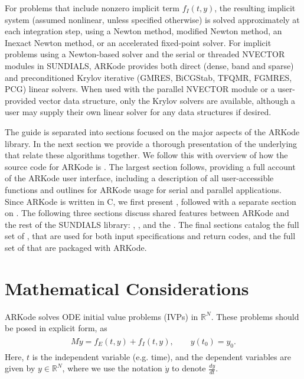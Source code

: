 \documentclass[letterpaper,10pt,english]{sphinxmanual}
\begin{document}
For problems that include nonzero implicit term \(f_I(t,y)\), the
resulting implicit system (assumed nonlinear, unless specified
otherwise) is solved approximately at each integration step, using a
Newton method, modified Newton method, an Inexact Newton method, or an
accelerated fixed-point solver.  For implicit problems using a
Newton-based solver and the serial or threaded NVECTOR modules in
SUNDIALS, ARKode provides both direct (dense, band and sparse) and
preconditioned Krylov iterative (GMRES, BiCGStab, TFQMR, FGMRES, PCG)
linear solvers. When used with the parallel NVECTOR module or a
user-provided vector data structure, only the Krylov solvers are
available, although a user may supply their own linear solver for any
data structures if desired.

The guide is separated into sections focused on the major aspects of
the ARKode library.  In the next section we provide a thorough
presentation of the underlying {\hyperref[Mathematics:mathematics]{\emph{}}} that
relate these algorithms together.  We follow this with overview of how
the source code for ARKode is {\hyperref[Organization:organization]{\emph{}}}.  The
largest section follows, providing a full account of the ARKode user
interface, including a description of all user-accessible functions
and outlines for ARKode usage for serial and parallel applications.
Since ARKode is written in C, we first present {\hyperref[c_interface/index:cinterface]{\emph{}}}, followed with a separate section on
{\hyperref[f_interface/index:fortraninterface]{\emph{}}}.  The
following three sections discuss shared features between ARKode and
the rest of the SUNDIALS library: {\hyperref[nvectors/index:nvectors]{\emph{}}},
{\hyperref[linear_solvers/index:linearsolvers]{\emph{}}}, and the {\hyperref[Install:installation]{\emph{}}}.  The final sections catalog the full set of
{\hyperref[Constants:constants]{\emph{}}}, that are used for both input
specifications and return codes, and the full set of
{\hyperref[Butcher:butcher]{\emph{}}} that are packaged with
ARKode.


\chapter{Mathematical Considerations}
\label{Mathematics:mathematics}\label{Mathematics::doc}\label{Mathematics:mathematical-considerations}
ARKode solves ODE initial value problems (IVPs) in \(\mathbb{R}^N\).
These problems should be posed in explicit form, as
\label{Mathematics:equation-IVP}\begin{gather}
\begin{split}M\dot{y} = f_E(t,y) + f_I(t,y), \qquad y(t_0) = y_0.\end{split}\label{Mathematics-IVP}
\end{gather}
Here, \(t\) is the independent variable (e.g. time), and the
dependent variables are given by \(y \in \mathbb{R}^N\), where we
use the notation \(\dot{y}\) to denote \(\frac{dy}{dt}\).
\end{document}
